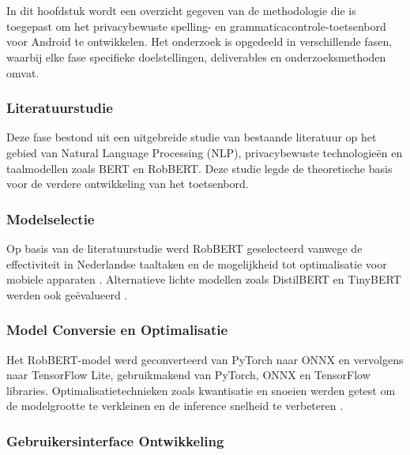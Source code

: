 
\chapter{}%
\label{ch:methodologie}

In dit hoofdstuk wordt een overzicht gegeven van de methodologie die is toegepast om het privacybewuste spelling- en grammaticacontrole-toetsenbord voor Android te ontwikkelen. Het onderzoek is opgedeeld in verschillende fasen, waarbij elke fase specifieke doelstellingen, deliverables en onderzoeksmethoden omvat.

\subsection{Literatuurstudie}

Deze fase bestond uit een uitgebreide studie van bestaande literatuur op het gebied van Natural Language Processing (NLP), privacybewuste technologieën en taalmodellen zoals BERT en RobBERT. Deze studie legde de theoretische basis voor de verdere ontwikkeling van het toetsenbord.

\subsection{Modelselectie}

Op basis van de literatuurstudie werd RobBERT geselecteerd vanwege de effectiviteit in Nederlandse taaltaken en de mogelijkheid tot optimalisatie voor mobiele apparaten \autocite{Delobelle2020}. Alternatieve lichte modellen zoals DistilBERT en TinyBERT werden ook geëvalueerd \autocite{Sanh2019DistilBERT}.

\subsection{Model Conversie en Optimalisatie}

Het RobBERT-model werd geconverteerd van PyTorch naar ONNX en vervolgens naar TensorFlow Lite, gebruikmakend van PyTorch, ONNX en TensorFlow libraries. Optimalisatietechnieken zoals kwantisatie en snoeien werden getest om de modelgrootte te verkleinen en de inference snelheid te verbeteren \autocite{Wang2022}.

\subsection{Gebruikersinterface Ontwikkeling}

